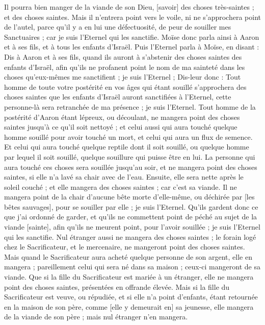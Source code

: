 \begin{multicols}{2}
Il pourra bien manger de la viande de son Dieu, [savoir] des choses très-saintes ; et des choses saintes.
Mais il n'entrera point vers le voile, ni ne s'approchera point de l'autel, parce qu'il y a en lui une défectuosité, de peur de souiller mes Sanctuaires ; car je suis l'Eternel qui les sanctifie.
Moïse donc parla ainsi à Aaron et à ses fils, et à tous les enfants d'Israël.
\VerseOne{}Puis l'Eternel parla à Moïse, en disant :
Dis à Aaron et à ses fils, quand ils auront à s'abstenir des choses saintes des enfants d'Israël, afin qu'ils ne profanent point le nom de ma sainteté dans les choses qu'eux-mêmes me sanctifient ; je suis l'Eternel ;
Dis-leur donc : Tout homme de toute votre postérité en vos âges qui étant souillé s'approchera des choses saintes que les enfants d'Israël auront sanctifiées à l'Eternel, cette personne-là sera retranchée de ma présence ; je suis l'Eternel.
Tout homme de la postérité d'Aaron étant lépreux, ou découlant, ne mangera point des choses saintes jusqu'à ce qu'il soit nettoyé ; et celui aussi qui aura touché quelque homme souillé pour avoir touché un mort, et celui qui aura un flux de semence.
Et celui qui aura touché quelque reptile dont il soit souillé, ou quelque homme par lequel il soit souillé, quelque souillure qui puisse être en lui.
La personne qui aura touché ces choses sera souillée jusqu'au soir, et ne mangera point des choses saintes, si elle n'a lavé sa chair avec de l'eau.
Ensuite, elle sera nette après le soleil couché ; et elle mangera des choses saintes ; car c'est sa viande.
Il ne mangera point de la chair d'aucune bête morte d'elle-même, ou déchirée par [les bêtes sauvages], pour se souiller par elle ; je suis l'Eternel.
Qu'ils gardent donc ce que j'ai ordonné de garder, et qu'ils ne commettent point de péché au sujet de la viande [sainte], afin qu'ils ne meurent point, pour l'avoir souillée ; je suis l'Eternel qui les sanctifie.
Nul étranger aussi ne mangera des choses saintes ; le forain logé chez le Sacrificateur, et le mercenaire, ne mangeront point des choses saintes.
Mais quand le Sacrificateur aura acheté quelque personne de son argent, elle en mangera ; pareillement celui qui sera né dans sa maison ; ceux-ci mangeront de sa viande.
Que si la fille du Sacrificateur est mariée à un étranger, elle ne mangera point des choses saintes, présentées en offrande élevée.
Mais si la fille du Sacrificateur est veuve, ou répudiée, et si elle n'a point d'enfants, étant retournée en la maison de son père, comme [elle y demeurait en] sa jeunesse, elle mangera de la viande de son père ; mais nul étranger n'en mangera.

\end{multicols}
